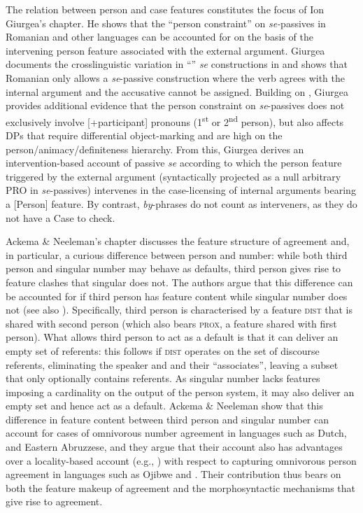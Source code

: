 \documentclass[output=paper]{langsci/langscibook}
\begin{document}
The relation between person and case features constitutes the focus of Ion Giurgea’s chapter. He shows that the ``person constraint'' on \textit{se-}passives in Romanian and other  languages can be accounted for on the basis of the intervening person feature associated with the external argument. Giurgea documents the crosslinguistic variation in ``'' \textit{se} constructions in  and shows that Romanian only allows a \textit{se}{}-passive construction where the verb agrees with the internal argument and the accusative cannot be assigned. Building on \citet{Cornilescu1998}, Giurgea provides additional evidence that the person constraint on \textit{se}-passives does not exclusively involve [+participant] pronouns (1\textsuperscript{st} or 2\textsuperscript{nd} person), but also affects DPs that require differential object-marking and are high on the person\slash animacy\slash definiteness hierarchy. From this, Giurgea derives an intervention-based account of passive \textit{se} according to which the person feature triggered by the external argument (syntactically projected as a null arbitrary PRO in \textit{se}{}-passives) intervenes in the case-licensing of internal arguments bearing a [Person] feature. By contrast, \textit{by}{}-phrases do not count as interveners, as they do not have a Case to check.

Ackema \& Neeleman’s chapter discusses the feature structure of agreement and, in particular, a curious difference between person and number: while both third person and singular number may behave as defaults, third person gives rise to feature clashes that singular does not. The authors argue that this difference can be accounted for if third person has feature content while singular number does not (see also \citealt{Nevins2007,Nevins2011}). Specifically, third person is characterised by a feature \textsc{dist} that is shared with second person (which also bears \textsc{prox}, a feature shared with first person). What allows third person to act as a default is that it can deliver an empty set of referents: this follows if \textsc{dist} operates on the set of discourse referents, eliminating the speaker and  and their ``associates'', leaving a subset that only optionally contains referents. As singular number lacks features imposing a cardinality on the output of the person system, it may also deliver an empty set and hence act as a default. Ackema \& Neeleman show that this difference in feature content between third person and singular number can account for cases of omnivorous number agreement in languages such as Dutch,  and Eastern Abruzzese, and they argue that their account also has advantages over a locality-based  account (e.g., \citealt{Preminger2014}) with respect to capturing omnivorous person agreement in languages such as Ojibwe and . Their contribution thus bears on both the feature makeup of agreement and the morphosyntactic mechanisms that give rise to agreement.
\end{document}
